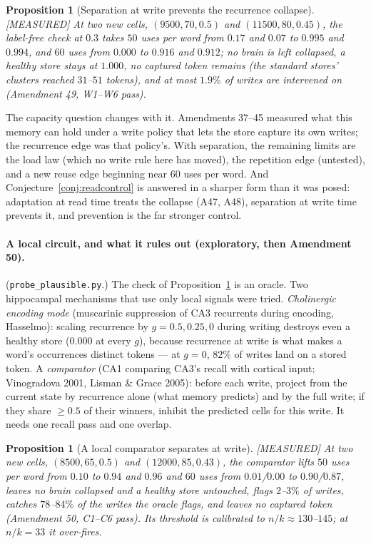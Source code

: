 \documentclass[11pt]{article}
\theoremstyle{definition}
\theoremstyle{plain}
\newtheorem{proposition}[lemma]{Proposition}
\newcommand{\MEASURED}{\textnormal{\footnotesize\textsf{[MEASURED]}}}
\begin{document}
\begin{proposition}[Separation at write prevents the recurrence collapse]\label{prop:separation} \MEASURED
At two new cells, $(9500,70,0.5)$ and $(11500,80,0.45)$, the label-free check at
$0.3$ takes $50$ uses per word from $0.17$ and $0.07$ to $0.995$ and $0.994$, and
$60$ uses from $0.000$ to $0.916$ and $0.912$; no brain is left collapsed, a
healthy store stays at $1.000$, no captured token remains (the standard stores'
clusters reached $31$--$51$ tokens), and at most $1.9\%$ of writes are intervened
on (Amendment 49, W1--W6 pass).
\end{proposition}

The capacity question changes with it. Amendments 37--45 measured what this
memory can hold under a write policy that lets the store capture its own
writes; the recurrence edge was that policy's. With separation, the remaining
limits are the load law (which no write rule here has moved), the repetition
edge (untested), and a new reuse edge beginning near $60$ uses per word. And
Conjecture~\ref{conj:readcontrol} is answered in a sharper form than it was
posed: adaptation at read time treats the collapse (A47, A48), separation at
write time prevents it, and prevention is the far stronger control.

\paragraph{A local circuit, and what it rules out (exploratory, then Amendment
50).} (\texttt{probe\_plausible.py}.) The check of
Proposition~\ref{prop:separation} is an oracle. Two hippocampal mechanisms that
use only local signals were tried. \emph{Cholinergic encoding mode} (muscarinic
suppression of CA3 recurrents during encoding, Hasselmo): scaling recurrence by
$g = 0.5, 0.25, 0$ during writing destroys even a healthy store ($0.000$ at
every $g$), because recurrence at write is what makes a word's occurrences
distinct tokens --- at $g = 0$, $82\%$ of writes land on a stored token. A
\emph{comparator} (CA1 comparing CA3's recall with cortical input; Vinogradova
2001, Lisman \& Grace 2005): before each write, project from the current state
by recurrence alone (what memory predicts) and by the full write; if they
share $\ge 0.5$ of their winners, inhibit the predicted cells for this write.
It needs one recall pass and one overlap.

\begin{proposition}[A local comparator separates at write]\label{prop:comparator} \MEASURED
At two new cells, $(8500,65,0.5)$ and $(12000,85,0.43)$, the comparator lifts
$50$ uses per word from $0.10$ to $0.94$ and $0.96$ and $60$ uses from
$0.01$/$0.00$ to $0.90$/$0.87$, leaves no brain collapsed and a healthy store
untouched, flags $2$--$3\%$ of writes, catches $78$--$84\%$ of the writes the
oracle flags, and leaves no captured token (Amendment 50, C1--C6 pass). Its
threshold is calibrated to $n/k \approx 130$--$145$; at $n/k = 33$ it over-fires.
\end{proposition}
\end{document}
